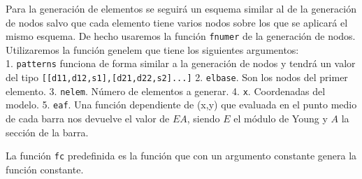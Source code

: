 \documentclass[11pt]{article}
\begin{document}
Para la generación de elementos se seguirá un esquema similar al de la
generación de nodos salvo que cada elemento tiene varios nodos sobre los
que se aplicará el mismo esquema. De hecho usaremos la función
\texttt{fnumer} de la generación de nodos. Utilizaremos la función
genelem que tiene los siguientes argumentos:\\
1. \texttt{patterns} funciona de forma similar a la generación de nodos
y tendrá un valor del tipo
\texttt{{[}{[}d11,d12,s1{]},{[}d21,d22,s2{]}...{]}} 2. \texttt{elbase}.
Son los nodos del primer elemento. 3. \texttt{nelem}. Número de
elementos a generar. 4. \texttt{x}. Coordenadas del modelo. 5.
\texttt{eaf}. Una función dependiente de (x,y) que evaluada en el punto
medio de cada barra nos devuelve el valor de $EA$, siendo $E$ el
módulo de Young y $A$ la sección de la barra.

La función \texttt{fc} predefinida es la función que con un argumento
constante genera la función constante.
\end{document}
